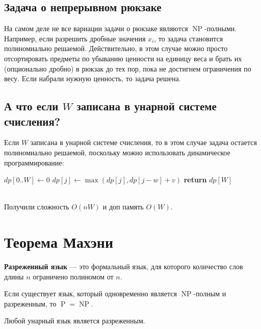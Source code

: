 \documentclass[11pt]{article}
\DeclareMathOperator{\Poly}{P}
\DeclareMathOperator{\NP}{NP}
\begin{document}
\subsection{Задача о непрерывном рюкзаке}

На самом деле не все вариации задачи о рюкзаке являются $\NP$-полными. Например, если разрешить дробные значения $x_i$, то задача становится полиномиально решаемой. 
Действительно, в этом случае можно просто отсортировать предметы по убыванию ценности на единицу веса и брать их (опционально дробно) в рюкзак до тех пор, пока не достигнем ограничения по весу. 
Если набрали нужную ценность, то задача решена.

\subsection{А что если $W$ записана в унарной системе счисления?}

Если $W$ записана в унарной системе счисления, то в этом случае задача остается полиномиально решаемой, поскольку можно использовать динамическое программирование:
\begin{algorithm}
\caption{Задача о рюкзаке}
\begin{algorithmic}[1]
    \STATE \(dp[0..W] \gets 0\)
            \STATE \(dp[j] \gets \max(dp[j], dp[j - w] + v)\)
        \ENDFOR
    \ENDFOR
    \STATE \textbf{return} \(dp[W]\)
\end{algorithmic}
\end{algorithm} \leavevmode
\\
Получили сложность $O(nW)$ и доп память $O(W)$.

\section{Теорема Махэни}

\begin{definition}
  \textbf{Разреженный язык} --- это формальный язык, для которого количество слов длины $n$ ограничено полиномом от $n$.
\end{definition}

\begin{theorem}[Махэни]
  Если существует язык, который одновременно является $\NP$-полным и разреженным, то $\Poly = \NP$.
\end{theorem}

\begin{lemma}
  Любой унарный язык является разреженным.
\end{lemma}
\end{document}
